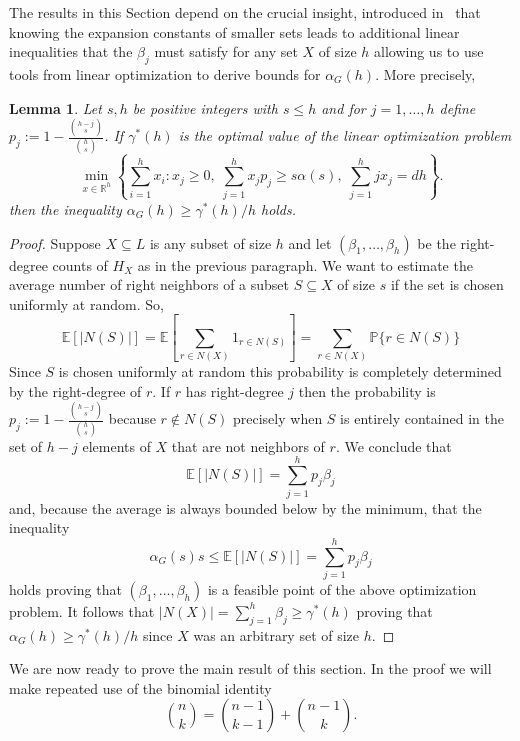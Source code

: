 \documentclass[12pt]{amsart}
\newtheorem{lemma}{Lemma}[section]
\theoremstyle{definition}
\renewcommand{\geq}{\geqslant}
\renewcommand{\leq}{\leqslant}
\newcommand{\PP}{\ensuremath{\mathbb{P}}}
\newcommand{\RR}{\ensuremath{\mathbb{R}}}
\newcommand{\EE}{\ensuremath{\mathbb{E}}}
\newcommand{\1}{\ensuremath{\mathbb{1}}}
\begin{document}
The results in this Section depend on the crucial insight, introduced in~\cite{CCLO} that knowing the expansion constants of smaller sets leads to additional linear inequalities that the $\beta_j$ must satisfy for any set $X$ of size $h$ allowing us to use tools from linear optimization to derive bounds for $\alpha_G(h)$. More precisely, 

\begin{lemma}\label{lem: linbound} Let $s,h$ be positive integers with $s\leq h$ and for $j=1,\dots, h$ define $p_j:=1-\frac{\binom{h-j}{s}}{\binom{h}{s}}$. If $\gamma^*(h)$ is the optimal value of the linear optimization problem 
\[\min_{x\in\RR^h}
\left\{
\sum_{i=1}^h x_i :
x_j\ge0,\;
\sum_{j=1}^h x_j p_j \ge s\alpha(s),
\;
\sum_{j=1}^h jx_j = dh
\right\}.\] 
then the inequality $\alpha_G(h)\geq \gamma^*(h)/h$ holds. 
\end{lemma}
\begin{proof} Suppose $X\subseteq L$ is any subset of size $h$ and let $(\beta_1,\dots, \beta_h)$ be the right-degree counts of $H_X$ as in the previous paragraph. We want to estimate the average number of right neighbors of a subset $S\subseteq X$ of size $s$ if the set is chosen uniformly at random. So,
\[\EE[|N(S)|]=\EE\left[\sum_{r\in N(X)} 1_{r\in N(S)}\right]=\sum_{r\in N(X)} \PP\{r\in N(S)\}\]
Since $S$ is chosen uniformly at random this probability is completely determined by the right-degree of $r$. If $r$ has right-degree $j$ then the probability is $p_j:=1-\frac{\binom{h-j}{s}}{\binom{h}{s}}$ because $r\not\in N(S)$ precisely when $S$ is entirely contained in the set of $h-j$ elements of $X$ that are not neighbors of $r$.
We conclude that
\[\EE[|N(S)|]=\sum_{j=1}^hp_j\beta_j\]
and, because the average is always bounded below by the minimum, that the inequality
\[\alpha_G(s)s\leq \EE[|N(S)|] = \sum_{j=1}^hp_j\beta_j\]
holds proving that $(\beta_1,\dots, \beta_h)$ is a feasible point of the above optimization problem.
It follows that $|N(X)|=\sum_{j=1}^h \beta_j\geq \gamma^*(h)$ proving that $\alpha_G(h)\geq \gamma^*(h)/h$  since $X$ was an arbitrary set of size $h$.\end{proof}

We are now ready to prove the main result of this section. In the proof we will make repeated use of the binomial identity
\[\binom{n}{k} = \binom{n-1}{k-1}+ \binom{n-1}{k}.\]
\end{document}
